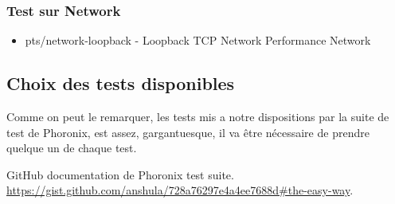 \documentclass[french]{article}
\begin{document}
\subsubsection{Test sur Network}
\begin{itemize}
\item pts/network-loopback           - Loopback TCP Network Performance    Network
\end{itemize}

\subsection{Choix des tests disponibles}
Comme on peut le remarquer, les tests mis a notre dispositions par la suite de test de Phoronix, est assez, gargantuesque, il va être nécessaire de prendre quelque un de chaque test.
\newpage
\begin{thebibliography}{9}

         GitHub documentation de Phoronix test suite.
          \url{https://gist.github.com/anshula/728a76297e4a4ee7688d#the-easy-way}.

\end{thebibliography}
\end{document}
